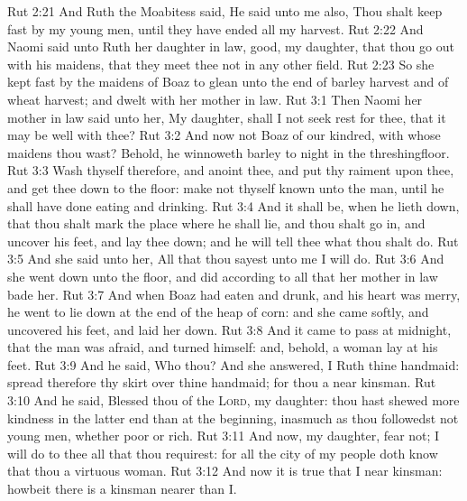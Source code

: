 \vs Rut 2:21 And Ruth the Moabitess said, He said unto me also, Thou shalt keep fast by my young men, until they have ended all my harvest.
\vs Rut 2:22 And Naomi said unto Ruth her daughter in law,  good, my daughter, that thou go out with his maidens, that they meet thee not in any other field.
\vs Rut 2:23 So she kept fast by the maidens of Boaz to glean unto the end of barley harvest and of wheat harvest; and dwelt with her mother in law.
\vs Rut 3:1 Then Naomi her mother in law said unto her, My daughter, shall I not seek rest for thee, that it may be well with thee?
\vs Rut 3:2 And now  not Boaz of our kindred, with whose maidens thou wast? Behold, he winnoweth barley to night in the threshingfloor.
\vs Rut 3:3 Wash thyself therefore, and anoint thee, and put thy raiment upon thee, and get thee down to the floor:  make not thyself known unto the man, until he shall have done eating and drinking.
\vs Rut 3:4 And it shall be, when he lieth down, that thou shalt mark the place where he shall lie, and thou shalt go in, and uncover his feet, and lay thee down; and he will tell thee what thou shalt do.
\vs Rut 3:5 And she said unto her, All that thou sayest unto me I will do.
\vs Rut 3:6 And she went down unto the floor, and did according to all that her mother in law bade her.
\vs Rut 3:7 And when Boaz had eaten and drunk, and his heart was merry, he went to lie down at the end of the heap of corn: and she came softly, and uncovered his feet, and laid her down.
\vs Rut 3:8 And it came to pass at midnight, that the man was afraid, and turned himself: and, behold, a woman lay at his feet.
\vs Rut 3:9 And he said, Who  thou? And she answered, I  Ruth thine handmaid: spread therefore thy skirt over thine handmaid; for thou  a near kinsman.
\vs Rut 3:10 And he said, Blessed  thou of the \textsc{Lord}, my daughter:  thou hast shewed more kindness in the latter end than at the beginning, inasmuch as thou followedst not young men, whether poor or rich.
\vs Rut 3:11 And now, my daughter, fear not; I will do to thee all that thou requirest: for all the city of my people doth know that thou  a virtuous woman.
\vs Rut 3:12 And now it is true that I  near kinsman: howbeit there is a kinsman nearer than I.
